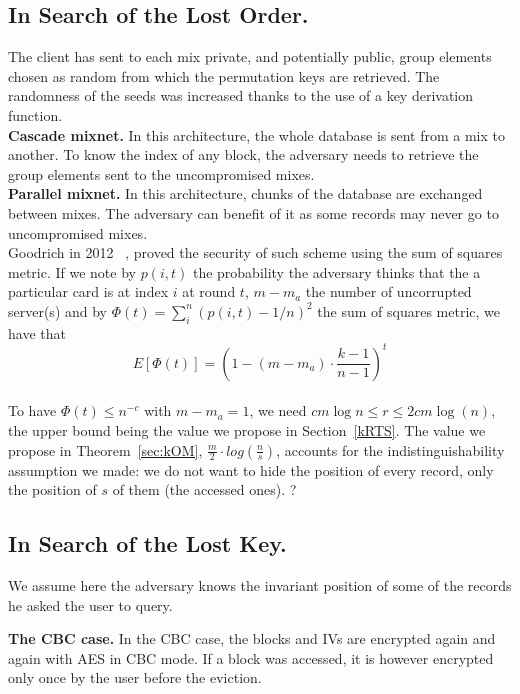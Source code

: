\documentclass[USenglish,oneside,twocolumn]{article}
\begin{document}
\subsection{In Search of the Lost Order.}
The client has sent to each mix private, and potentially public, group elements chosen as random from which the permutation keys are retrieved. The randomness of the seeds was increased thanks to the use of a key derivation function.\\

\noindent\textbf{Cascade mixnet.}
In this architecture, the whole database is sent from a mix to another. To know the index of any block, the adversary needs to retrieve the group elements sent to the uncompromised mixes. \\

\noindent\textbf{Parallel mixnet.}
In this architecture, chunks of the database are exchanged between mixes. The adversary can benefit of it as some records may never go to uncompromised mixes.\\
Goodrich in 2012 ~\cite{goodrich2012anonymous}, proved the security of such scheme using the sum of squares metric. If we note by $p(i,t)$ the probability the adversary thinks that the a particular card is at index $i$ at round $t$, $m-m_a$ the number of uncorrupted server(s) and by $\Phi(t)= \sum_{i}^{n}\left (p(i,t) - 1/n \right)^2$ the sum of squares metric, we have that $$E[\Phi(t)] = \left (1 - (m-m_a) \cdot \frac{k-1}{n-1}\right )^{t}$$\\
To have $\Phi(t) \leq n^{-c}$ with $m-m_a=1$, we need $cm \log n \leq r \leq 2cm \log(n)$, the upper bound being the value we propose in Section~\ref{kRTS}. The value we propose in Theorem~\ref{sec:kOM}, $\frac{m}{2} \cdot log\left ( \frac{n}{s} \right )$, accounts for the indistinguishability assumption we made: we do not want to hide the position of every record, only the position of $s$ of them (the accessed ones). ?

\subsection{In Search of the Lost Key.}
We assume here the adversary knows the invariant position of some of the records he asked the user to query. 

\noindent\textbf{The CBC case.}
In the CBC case, the blocks and IVs are encrypted again and again with AES in CBC mode. If a block was accessed, it is however encrypted only once by the user before the eviction.\\
\end{document}
